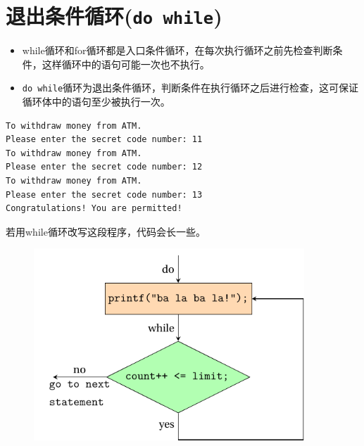 \section{退出条件循环(\lstinline|do while|)}
\begin{frame}[fragile]\ft{\secname}
\begin{itemize}
\item
while循环和for循环都是入口条件循环，在每次执行循环之前先检查判断条件，这样循环中的语句可能一次也不执行。\\[0.1in]
\item 
\lstinline|do while|循环为退出条件循环，判断条件在执行循环之后进行检查，这可保证循环体中的语句至少被执行一次。
\end{itemize}
\end{frame}

\begin{frame}\ft{\secname}


\end{frame}

\begin{frame}[fragile]\ft{\secname}
 \begin{lstlisting}[backgroundcolor=\color{red!10}]
To withdraw money from ATM.
Please enter the secret code number: 11
To withdraw money from ATM. 
Please enter the secret code number: 12
To withdraw money from ATM. 
Please enter the secret code number: 13
Congratulations! You are permitted!
\end{lstlisting}
\end{frame}

\begin{frame}\ft{\secname}
若用while循环改写这段程序，代码会长一些。



\end{frame}



\begin{frame}[fragile]\ft{\secname}
\begin{figure}
\centering
\includegraphics[width=4in]{ch06/images/do_while.pdf}
\end{figure}

\end{frame}


